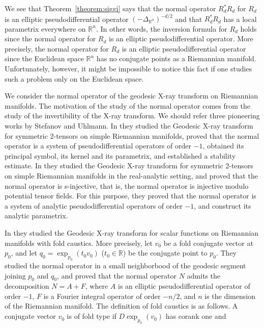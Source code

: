 \documentclass[a4paper,11pt,reqno]{amsart}
\theoremstyle{definition}
\theoremstyle{remark}
\begin{document}
%
%
We see that Theorem~\ref{theorem:siggi} says that the normal operator 
$R_d^\ast{R_d}$ for $R_d$ is an elliptic pseudodifferential operator $(-\Delta_{\mathbb{R}^n})^{-d/2}$ 
and that $R_d^\ast{R_d}$ has a local parametrix everywhere on $\mathbb{R}^n$. 
In other words, the inversion formula for $R_d$ holds 
since the normal operator for $R_d$ is an elliptic pseudodifferential operator. 
More precisely, 
the normal operator for $R_d$ is an elliptic pseudodifferential operator 
since the Euclidean space $\mathbb{R}^n$ has 
no conjugate points as a Riemannian manifold. 
Unfortunately, however, it might be impossible to notice this fact 
if one studies such a problem only on the Euclidean space. 
%
%
\par
%
%
We consider the normal operator of the geodesic X-ray transform on Riemannian manifolds. The motivation of the study of the normal operator comes from the study of the invertibility of the X-ray transform. We should refer three pioneering works \cite{PlamenGunther1,PlamenGunther2,PlamenGunther3} by Stefanov and Uhlmann. In \cite{PlamenGunther1} they studied the Geodesic X-ray transform for symmetric 2-tensors on simple Riemannian manifolds, proved that the normal operator is a system of pseudodifferential operators of order $-1$, obtained its principal symbol, its kernel and its parametrix, and established a stability estimate. 
In \cite{PlamenGunther2} they studied the Geodesic X-ray transform for symmetric 2-tensors on simple Riemannian manifolds in the real-analytic setting, and proved that the normal operator is s-injective, that is, the normal operator is injective modulo potential tensor fields. For this purpose, they proved that the normal operator is a system of analytic pseudodifferential operators of order $-1$, and construct its analytic parametrix. 
%
%
\par
%
%
In \cite{PlamenGunther3} they studied the Geodesic X-ray transform for scalar functions on Riemannian manifolds with fold caustics. More precisely, let $v_0$ be a fold conjugate vector at $p_0$, and let $q_0=\exp_{p_0}(t_0v_0)$ ($t_0\in\mathbb{R}$) be the conjugate point to $p_0$. They studied the normal operator in a small neighborbood of the geodesic segment joining $p_0$ and $q_0$, and proved that the normal operator $N$ admits the decomposition $N=A+F$, where $A$ is an elliptic pseudodifferential operator of order $-1$, $F$ is a Fourier integral operator of order $-n/2$, and $n$ is the dimension of the Riemannian manifold. The definition of fold caustics is as follows. 
A conjugate vector $v_0$ is of fold type if $D\exp_{p_0}(v_0)$ has corank one and
\end{document}
